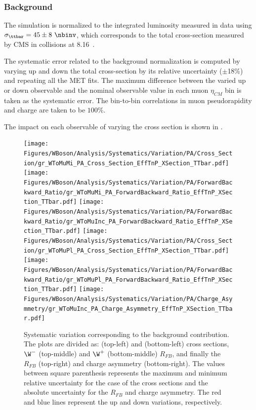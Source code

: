\clearpage
\subsubsection{\texorpdfstring{\ttbar}\ Background}

The \ttbar simulation is normalized to the integrated luminosity measured in data using $\sigma_{\ttbar} = 45 \pm 8~\nbinv$, which corresponds to the total \ttbar cross-section measured by CMS in \pPb collisions at 8.16~\TeV \cite{HIN-17-002}.

The systematic error related to the \ttbar background normalization is computed by varying up and down the total cross-section by its relative uncertainty ($\pm$18\%) and repeating all the MET fits. The maximum difference between the varied up or down observable and the nominal observable value in each muon $\eta_{CM}$ bin is taken as the systematic error. The bin-to-bin correlations in muon pseudorapidity and charge are taken to be $100\%$.

The impact on each observable of varying the \ttbar cross section is shown in .

\begin{figure}[htbp]
 \begin{center}
  \texttt{[image: Figures/WBoson/Analysis/Systematics/Variation/PA/Cross\_Section/gr\_WToMuMi\_PA\_Cross\_Section\_EffTnP\_XSection\_TTbar.pdf]}
  \texttt{[image: Figures/WBoson/Analysis/Systematics/Variation/PA/ForwardBackward\_Ratio/gr\_WToMuMi\_PA\_ForwardBackward\_Ratio\_EffTnP\_XSection\_TTbar.pdf]}
  \texttt{[image: Figures/WBoson/Analysis/Systematics/Variation/PA/ForwardBackward\_Ratio/gr\_WToMuInc\_PA\_ForwardBackward\_Ratio\_EffTnP\_XSection\_TTbar.pdf]}
  \texttt{[image: Figures/WBoson/Analysis/Systematics/Variation/PA/Cross\_Section/gr\_WToMuPl\_PA\_Cross\_Section\_EffTnP\_XSection\_TTbar.pdf]}
  \texttt{[image: Figures/WBoson/Analysis/Systematics/Variation/PA/ForwardBackward\_Ratio/gr\_WToMuPl\_PA\_ForwardBackward\_Ratio\_EffTnP\_XSection\_TTbar.pdf]}
  \texttt{[image: Figures/WBoson/Analysis/Systematics/Variation/PA/Charge\_Asymmetry/gr\_WToMuInc\_PA\_Charge\_Asymmetry\_EffTnP\_XSection\_TTbar.pdf]}
 \end{center}
 \caption{Systematic variation corresponding to the \ttbar background contribution. The plots are divided as: \WToMuNuMi (top-left) and \WToMuNuPl (bottom-left) cross sections, $\W^{-}$ (top-middle) and $\W^{+}$ (bottom-middle) $R_{FB}$, and finally the \W $R_{FB}$ (top-right) and \W charge asymmetry (bottom-right). The values between square parenthesis represents the maximum and minimum relative uncertainty for the case of the cross sections and the absolute uncertainty for the $R_{FB}$ and charge asymmetry. The red and blue lines represent the up and down variations, respectively.}
 \label{fig:Systematic_TTbar}
\end{figure}


